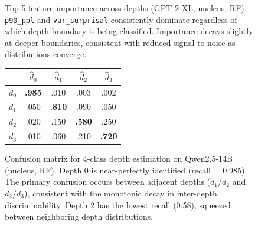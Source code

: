 \documentclass[11pt,a4paper]{article}
\begin{document}
\begin{figure}[t]
\centering
{}
\caption{Top-5 feature importance across depths (GPT-2 XL, nucleus, RF). \texttt{p90\_ppl} and \texttt{var\_surprisal} consistently dominate regardless of which depth boundary is being classified. Importance decays slightly at deeper boundaries, consistent with reduced signal-to-noise as distributions converge.}
\label{fig:feature_importance}
\end{figure}

\begin{figure}[t]
\centering
\small
\begin{tabular}{c|cccc}
 & $\hat{d}_0$ & $\hat{d}_1$ & $\hat{d}_2$ & $\hat{d}_3$ \\
\hline
$d_0$ & \textbf{.985} & .010 & .003 & .002 \\
$d_1$ & .050 & \textbf{.810} & .090 & .050 \\
$d_2$ & .020 & .150 & \textbf{.580} & .250 \\
$d_3$ & .010 & .060 & .210 & \textbf{.720} \\
\end{tabular}
\caption{Confusion matrix for 4-class depth estimation on Qwen2.5-14B (nucleus, RF). Depth 0 is near-perfectly identified (recall = 0.985). The primary confusion occurs between adjacent depths ($d_1$/$d_2$ and $d_2$/$d_3$), consistent with the monotonic decay in inter-depth discriminability. Depth 2 has the lowest recall (0.58), squeezed between neighboring depth distributions.}
\label{fig:confusion}
\end{figure}
\end{document}
